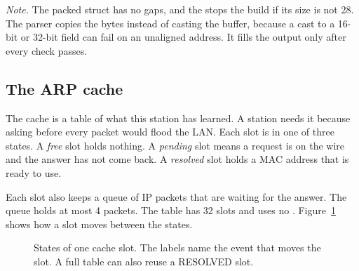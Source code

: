 \emph{Note.} The packed struct has no gaps, and the  stops the build if its size is not 28. The parser copies the bytes instead of casting the buffer, because a cast to a 16-bit or 32-bit field can fail on an unaligned address. It fills the output only after every check passes.

\subsection{The ARP cache}\label{sec:core-cache}
The cache is a table of what this station has learned. A station needs it because asking before every packet would flood the LAN. Each slot is in one of three states. A \emph{free} slot holds nothing. A \emph{pending} slot means a request is on the wire and the answer has not come back. A \emph{resolved} slot holds a MAC address that is ready to use.

Each slot also keeps a queue of IP packets that are waiting for the answer. The queue holds at most 4 packets. The table has 32 slots and uses no . Figure~\ref{fig:core-states} shows how a slot moves between the states.

\begin{figure}[htbp]
\centering
{}
\caption{States of one cache slot. The labels name the event that moves the slot. A full table can also reuse a RESOLVED slot.}
\label{fig:core-states}
\end{figure}

